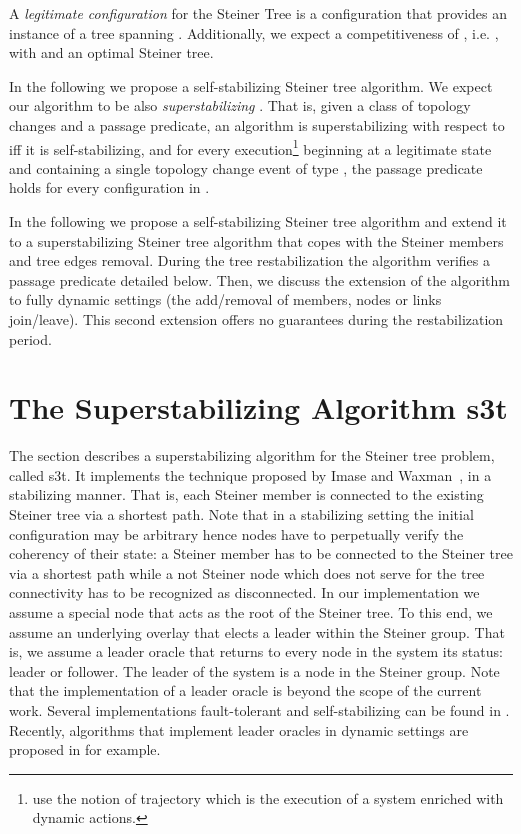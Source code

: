\documentclass[11pt]{article}
\newcommand{\STT}{{\sc s3t}}
\begin{document}
A {\it legitimate configuration} for the Steiner Tree is a
configuration that provides an instance of a tree  spanning . 
Additionally, we expect a competitiveness of , 
i.e. , with  and  an optimal Steiner tree.

In the following we propose a self-stabilizing Steiner tree algorithm.
We expect our algorithm to be also {\it superstabilizing}
\cite{Dolev_SuperStab}. That is, 
given a class of topology changes  and a passage predicate, an algorithm 
is superstabilizing with respect to  iff it
is self-stabilizing, and for every
execution\footnote{\cite{Dolev_SuperStab} use the notion of trajectory
which is the execution of a system enriched with dynamic actions.}  beginning at a
legitimate state and containing a single topology change event of type
, the passage predicate holds for every configuration in .










In the following we propose a self-stabilizing Steiner tree algorithm and
extend it 
to a superstabilizing Steiner tree algorithm
that copes with the Steiner members and tree edges removal. During the tree
restabilization the algorithm verifies a passage predicate detailed below. 
Then, we discuss the extension of the algorithm to fully dynamic
settings (the add/removal of members, nodes or links join/leave). 
This second extension offers no guarantees during the restabilization period.


\section{The Superstabilizing Algorithm \STT}






The section describes a superstabilizing algorithm for the Steiner tree problem, called \STT.
It implements the
technique proposed by Imase and
Waxman~\cite{ImaseWaxman91},  in a stabilizing manner. That is, each Steiner member is connected
to the existing Steiner tree via a shortest path. Note that in a
stabilizing setting the initial configuration may be arbitrary hence
nodes have to perpetually verify the coherency of their state:
a Steiner member has to be connected to the Steiner
tree via a shortest path while a not Steiner node which does not
serve for the tree connectivity has to be recognized as disconnected.
In our implementation we assume a special node that acts as the root
of the Steiner tree. To this end, we assume an underlying overlay that elects a
leader within the Steiner group. That is, we assume a leader oracle that returns to every node
in the system its status: leader or follower. The leader of the system
is a node in the Steiner group. Note that the implementation of a
leader oracle is beyond the scope of the current work. Several
implementations fault-tolerant and self-stabilizing can be found in
\cite{DDF07}. Recently, algorithms that implement leader
oracles in dynamic settings are proposed in \cite{Baldoni08} for example.
\end{document}
